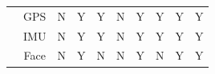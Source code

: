\begin{table}[h!]
{\begin{tabular}{|c|c|c|c|c|c|c|c|c|c|}
\cline{2-10}
                          & GPS                                                       & N                                                                                         & Y                                                                                                & Y                                                                 & N                                                                                       & Y                                                                                        & Y                                                                 & Y                                                                                                      & Y                                                                \\ 
\cline{2-10}
                          & IMU                                                       & N                                                                                         & Y                                                                                                & Y                                                                 & N                                                                                       & Y                                                                                        & Y                                                                 & Y                                                                                                      & Y                                                                \\ 
\cline{2-10}
                          & Face                                                      & N                                                                                         & Y                                                                                                & N                                                                 & N                                                                                       & Y                                                                                        & N                                                                 & Y                                                                                                      & Y                                                                \\ 
\cline{2-10}

\end{tabular}}
\end{table}
